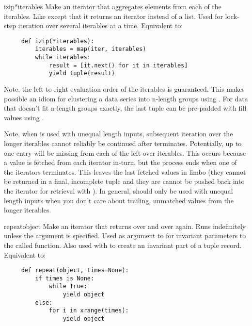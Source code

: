 \begin{funcdesc}{izip}{*iterables}
  Make an iterator that aggregates elements from each of the iterables.
  Like  except that it returns an iterator instead of
  a list.  Used for lock-step iteration over several iterables at a
  time.  Equivalent to:

  \begin{verbatim}
     def izip(*iterables):
         iterables = map(iter, iterables)
         while iterables:
             result = [it.next() for it in iterables]
             yield tuple(result)
  \end{verbatim}


  Note, the left-to-right evaluation order of the iterables is guaranteed.
  This makes possible an idiom for clustering a data series into n-length
  groups using .  For data that doesn't fit
  n-length groups exactly, the last tuple can be pre-padded with fill
  values using .
         
  Note, when  is used with unequal length inputs, subsequent
  iteration over the longer iterables cannot reliably be continued after
   terminates.  Potentially, up to one entry will be missing
  from each of the left-over iterables. This occurs because a value is fetched
  from each iterator in-turn, but the process ends when one of the iterators
  terminates.  This leaves the last fetched values in limbo (they cannot be
  returned in a final, incomplete tuple and they are cannot be pushed back
  into the iterator for retrieval with ).  In general,
   should only be used with unequal length inputs when you
  don't care about trailing, unmatched values from the longer iterables.
\end{funcdesc}

\begin{funcdesc}{repeat}{object}
  Make an iterator that returns  over and over again.
  Runs indefinitely unless the  argument is specified.
  Used as argument to  for invariant parameters
  to the called function.  Also used with  to create
  an invariant part of a tuple record.  Equivalent to:

  \begin{verbatim}
     def repeat(object, times=None):
         if times is None:
             while True:
                 yield object
         else:
             for i in xrange(times):
                 yield object
  \end{verbatim}
\end{funcdesc}

